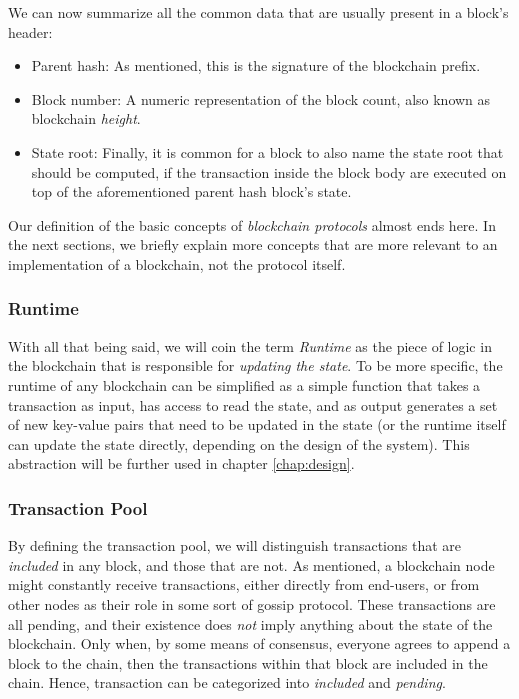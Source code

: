 We can now summarize all the common data that are usually present in a block's header:

\begin{itemize}
	\item Parent hash: As mentioned, this is the signature of the blockchain prefix.
	\item Block number: A numeric representation of the block count, also known as blockchain
	\textit{height}.
	\item State root: Finally, it is common for a block to also name the state root that should be
	computed, if the transaction inside the block body are executed on top of the aforementioned
	parent hash block's state.
\end{itemize}

Our definition of the basic concepts of \textit{blockchain protocols} almost ends here. In the next
sections, we briefly explain more concepts that are more relevant to an implementation of a
blockchain, not the protocol itself.

\subsubsection{Runtime} \label{chap_bg:subsec:runtime}

With all that being said, we will coin the term \textit{Runtime} as the piece of logic in the
blockchain that is responsible for \textit{updating the state}. To be more specific, the runtime of
any blockchain can be simplified as a simple function that takes a transaction as input, has access
to read the state, and as output generates a set of new key-value pairs that need to be updated in
the state (or the runtime itself can update the state directly, depending on the design of the
system). This abstraction will be further used in chapter \ref{chap:design}.

\subsubsection{Transaction Pool} \label{chap_bg:subsec:tx_pool}

By defining the transaction pool, we will distinguish transactions that are \textit{included} in any
block, and those that are not. As mentioned, a blockchain node might constantly receive
transactions, either directly from end-users, or from other nodes as their role in some sort of
gossip protocol. These transactions are all pending, and their existence does \textit{not} imply
anything about the state of the blockchain. Only when, by some means of consensus, everyone agrees
to append a block to the chain, then the transactions within that block are included in the chain.
Hence, transaction can be categorized into \textit{included} and \textit{pending}.

